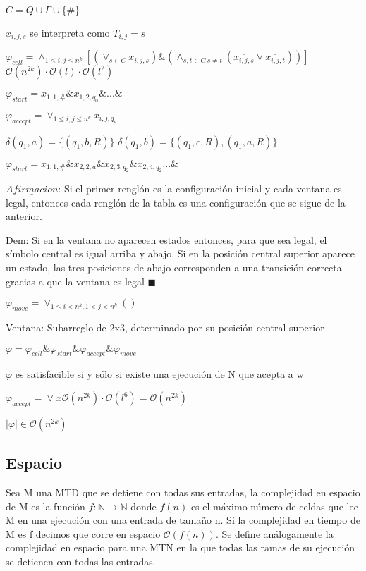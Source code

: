 \documentclass{homework}
\begin{document}
$C = Q \cup \Gamma \cup \{\#\}$

$x_{i,j,s}$ se interpreta como $T_{i,j} = s$

$\varphi_{cell} = \wedge_{1 \leq i, j \leq n^k} [(\vee_{s \in C} x_{i,j,s}) \& (\wedge_{s,t \in C  \ s \neq t}(\overline{x_{i,j,s}} \vee \overline{x_{i,j,t}}))]$ $\mathcal{O}(n^{2k}) \cdot \mathcal{O}(l) \cdot \mathcal{O}(l^2)$

$\varphi_{start} = x_{1,1,\#} \& x_{1,2,q_0} \& ... \&$


$\varphi_{accept} = \vee_{1 \leq i, j \leq n^k} x_{i,j,q_a}$

$\delta (q_1, a) = \{(q_1, b, R)\}$
$\delta (q_1, b) = \{(q_1, c, R), (q_1,a,R)\}$

$\varphi_{start} = x_{1,1,\#} \& x_{2,2,a} \& x_{2,3,q_2} \& x_{2,4,q_2}... \&$

$\underline{Afirmacion}$: Si el primer renglón es la configuración inicial y cada ventana es legal, entonces cada renglón de la tabla es una configuración que se sigue de la anterior.

Dem: Si en la ventana no aparecen estados entonces, para que sea legal, el símbolo central es igual arriba y abajo. Si en la posición central superior aparece un estado, las tres posiciones de abajo corresponden a una transición correcta gracias a que la ventana es legal $\blacksquare$

$\varphi_{move} = \vee_{1 \leq i < n^k, 1 < j < n^k} ()$

Ventana: Subarreglo de 2x3, determinado por su posición central superior


$\varphi = \varphi_{cell} \& \varphi_{start} \& \varphi_{accept} \& \varphi_{move}$

$\varphi$ es satisfacible si y sólo si existe una ejecución de N que acepta a w

$\varphi_{accept} = \vee_{}x \mathcal{O}(n^{2k}) \cdot \mathcal{O}(l^6) =  \mathcal{O}(n^{2k}) $

$|\varphi| \in \mathcal{O}(n^{2k})$

\subsection{Espacio}

Sea M una MTD que se detiene con todas sus entradas, la complejidad en espacio de M es la función $f: \mathds{N} \rightarrow \mathds{N}$ donde $f(n)$ es el máximo número de celdas que lee M en una ejecución con una entrada de tamaño n. Si la complejidad en tiempo de M es f decimos que corre en espacio $\mathcal{O}(f(n))$. Se define análogamente la complejidad en espacio para una MTN en la que todas las ramas de su ejecución se detienen con todas las entradas.
\end{document}
